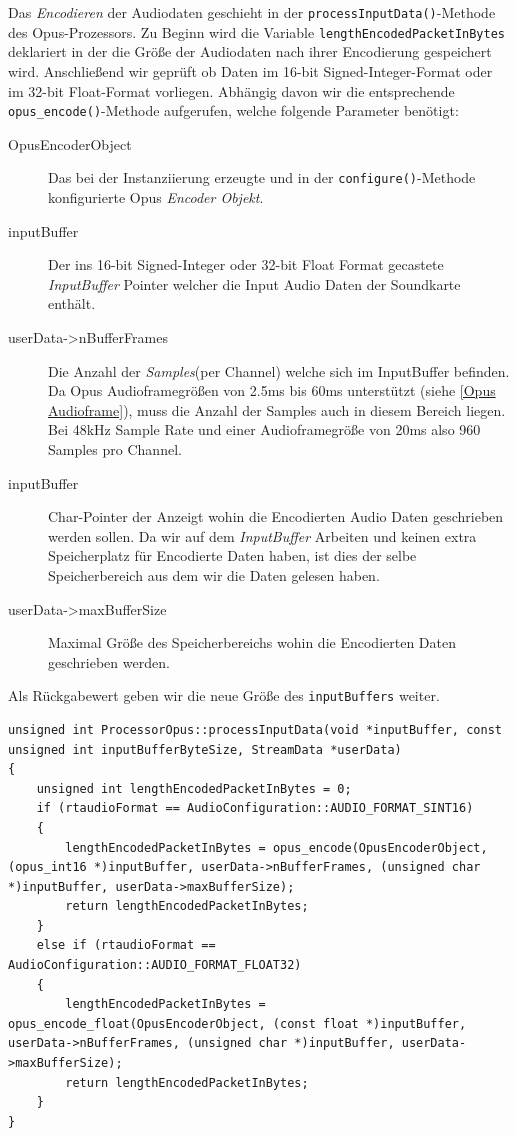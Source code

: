 Das \textit{Encodieren} der Audiodaten geschieht in der \texttt{processInputData()}-Methode des Opus-Prozessors. Zu Beginn wird die Variable \texttt{lengthEncodedPacketIn\-Bytes} deklariert in der die Größe der Audiodaten nach ihrer Encodierung gespeichert wird. Anschließend wir geprüft ob Daten im 16-bit Signed-Integer-Format oder im 32-bit Float-Format vorliegen.
Abhängig davon wir die entsprechende \texttt{opus\_encode()}-Methode aufgerufen, welche folgende Parameter benötigt:

\begin{description}
\item[OpusEncoderObject] Das bei der Instanziierung erzeugte und in der \texttt{configure()}-Methode konfigurierte Opus \textit{Encoder Objekt}.
\item[inputBuffer] Der ins 16-bit Signed-Integer oder 32-bit Float Format gecastete \textit{InputBuffer} Pointer welcher die Input Audio Daten der Soundkarte enthält.
\item[userData->nBufferFrames] Die Anzahl der \textit{Samples}(per Channel) welche sich im InputBuffer befinden. Da Opus Audioframegrößen von 2.5ms bis 60ms unterstützt (siehe \ref{Opus Audioframe}), muss die Anzahl der Samples auch in diesem Bereich liegen. Bei 48kHz Sample Rate und einer Audioframegröße von 20ms also 960 Samples pro Channel.
\item[inputBuffer] Char-Pointer der Anzeigt wohin die Encodierten Audio Daten geschrieben werden sollen. Da wir auf dem \textit{InputBuffer} Arbeiten und keinen extra Speicherplatz für Encodierte Daten haben, ist dies der selbe Speicherbereich aus dem wir die Daten gelesen haben.
\item[userData->maxBufferSize] Maximal Größe des Speicherbereichs wohin die Encodierten Daten geschrieben werden.
\end{description}

Als Rückgabewert geben wir die neue Größe des \texttt{inputBuffers} weiter. 


\begin{lstlisting}[caption={Encodieren von Audio Daten mittels Opus},label={Code:Opus Encodieren}]
unsigned int ProcessorOpus::processInputData(void *inputBuffer, const unsigned int inputBufferByteSize, StreamData *userData)
{
    unsigned int lengthEncodedPacketInBytes = 0;
    if (rtaudioFormat == AudioConfiguration::AUDIO_FORMAT_SINT16)
    {
        lengthEncodedPacketInBytes = opus_encode(OpusEncoderObject, (opus_int16 *)inputBuffer, userData->nBufferFrames, (unsigned char *)inputBuffer, userData->maxBufferSize);
        return lengthEncodedPacketInBytes;
    }
    else if (rtaudioFormat == AudioConfiguration::AUDIO_FORMAT_FLOAT32)
    {
        lengthEncodedPacketInBytes = opus_encode_float(OpusEncoderObject, (const float *)inputBuffer, userData->nBufferFrames, (unsigned char *)inputBuffer, userData->maxBufferSize);
        return lengthEncodedPacketInBytes;
    }
}
\end{lstlisting}

